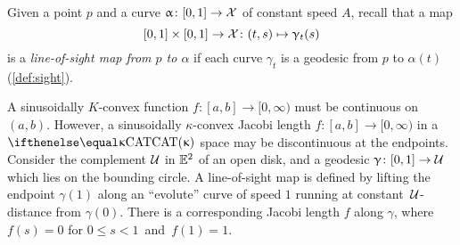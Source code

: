 Given  a point  $p$ and a curve $\alpha\:[0,1]\to \spc{X}$ of constant speed $A$, recall that a map
\[
[0,1]\times[0,1]\to\spc{X}\:(t,s)\mapsto\gamma_t(s)
\] 
is a \emph{line-of-sight map from $p$ to $\alpha$} 
if each curve $\gamma_t$ is a geodesic from $p$ to  $\alpha(t)$ (\ref{def:sight}). 

A sinusoidally $K$-convex function $f:[a,b]\to [0,\infty)$ must be continuous on $(a,b)$.
However, a sinusoidally $\kappa$-convex Jacobi length $f:[a,b]\to [0,\infty)$  in a $\CAT\kappa$ space may be discontinuous at the endpoints. 
Consider the complement $\mathcal{U}$  in  $ \mathbb{E}^2$ of an open disk, and  a 
geodesic $\gamma\: [0,1]\to\spc{U}$  which lies on the bounding circle.  
A line-of-sight  map is defined by lifting the endpoint $\gamma(1)$ along an ``evolute''  curve of speed $1$ running at constant \,$\mathcal{U}$-distance from $\gamma(0)$. 
There is a  corresponding Jacobi length $f$ along $\gamma$, where   $f(s)=0$ for $0\le s <1$ \,and\,  $f(1)=1$.






